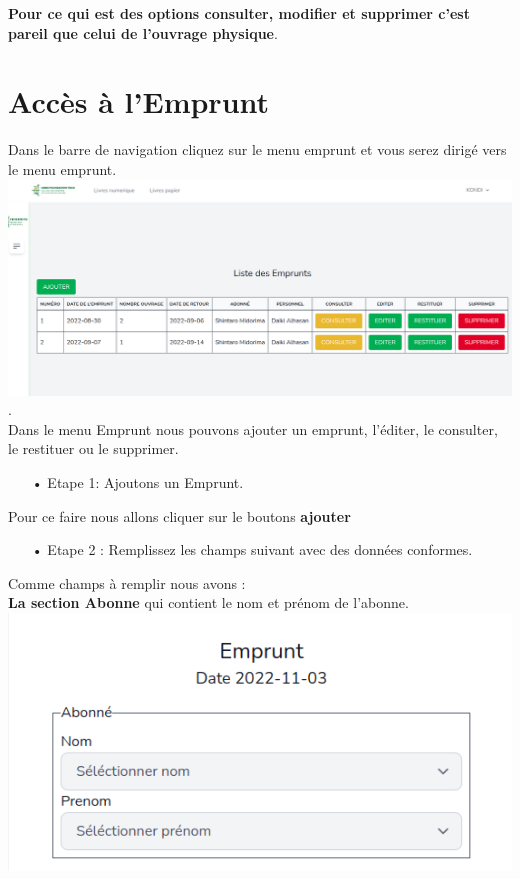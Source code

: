 \documentclass[12pt,a4paper]{article}
\begin{document}
\textbf{Pour ce qui est des options consulter, modifier et supprimer c'est pareil que celui de l'ouvrage physique}.\\

\newpage
\section{Accès à l'Emprunt}
Dans le barre de navigation cliquez sur le menu emprunt et vous serez dirigé vers le menu emprunt.\\

\includegraphics[scale=0.35]{images/Emprunt.png}.\\

Dans le menu Emprunt nous pouvons ajouter un emprunt, l'éditer, le consulter, le restituer ou le supprimer.

\begin{itemize}
\item[•]Etape 1: Ajoutons un Emprunt.
\end{itemize}

Pour ce faire nous allons cliquer sur le boutons \textbf{ajouter} 

\begin{itemize}
\item[•]Etape 2 : Remplissez les champs suivant avec des données conformes.
\end{itemize}

Comme champs à remplir nous avons :\\
\textbf{La section Abonne} qui contient le nom et prénom de l'abonne.\\

\includegraphics[scale=0.5]{images/Abonne.png}
\end{document}

